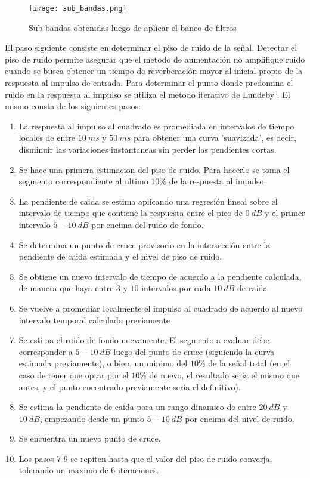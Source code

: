 \begin{figure}[H]
	\centering{}
	\texttt{[image: sub\_bandas.png]}
	\caption{Sub-bandas obtenidas luego de aplicar el banco de filtros}
	\label{fig:sub_bandas}
\end{figure}

El paso siguiente consiste en determinar el piso de ruido de la señal. Detectar el piso de ruido permite asegurar que el metodo de aumentación no amplifique ruido cuando se busca obtener un tiempo de reverberación mayor al inicial propio de la respuesta al impulso de entrada. Para determinar el punto donde predomina el ruido en la respuesta al impulso se utiliza el metodo iterativo de Lundeby \cite{Lundeby}. El mismo consta de los siguientes pasos: 

\begin{enumerate}
\item La respuesta al impulso al cuadrado es promediada en intervalos de tiempo locales de entre $10 \ ms$ y $50 \ ms$ para obtener una curva 'suavizada', es decir, disminuir las variaciones instantaneas sin perder las pendientes cortas.
\item Se hace una primera estimacion del piso de ruido. Para hacerlo se toma el segmento correspondiente al ultimo $10\%$ de la respuesta al impulso.
\item La pendiente de caida se estima aplicando una regresión lineal sobre el intervalo de tiempo que contiene la respuesta entre el pico de $0 \ dB$ y el primer intervalo $5-10 \ dB$ por encima del ruido de fondo.
\item Se determina un punto de cruce provisorio en la intersección entre la pendiente de caida estimada y el nivel de piso de ruido.
\item Se obtiene un nuevo intervalo de tiempo de acuerdo a la pendiente calculada, de manera que haya entre $3$ y $10$ intervalos por cada $10 \ dB$ de caida
\item Se vuelve a promediar localmente el impulso al cuadrado de acuerdo al nuevo intervalo temporal calculado previamente 
\item Se estima el ruido de fondo nuevamente. El segmento a evaluar debe corresponder a $5-10 \ dB$ luego del punto de cruce (siguiendo la curva estimada previamente), o bien, un minimo del $10\%$ de la señal total (en el caso de tener que optar por el $10\%$ de nuevo, el resultado seria el mismo que antes, y el punto encontrado previamente seria el definitivo).
\item Se estima la pendiente de caida para un rango dinamico de entre $20 \ dB$ y $10 \ dB$, empezando desde un punto $5-10 \ dB$ por encima del nivel de ruido.
\item Se encuentra un nuevo punto de cruce.
\item Los pasos 7-9 se repiten hasta que el valor del piso de ruido converja, tolerando un maximo de 6 iteraciones.
\end{enumerate}

